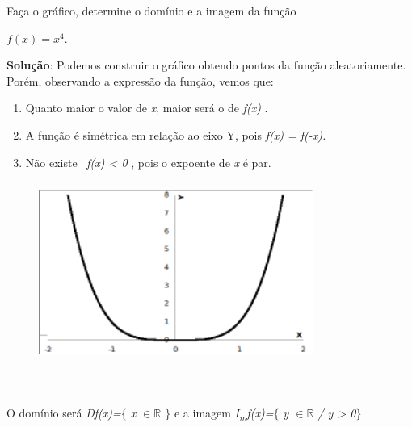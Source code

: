 \begin{texemplo}
Faça o gráfico, determine o domínio e a imagem da função 

\quad  $ f \left( x \right) =x^{4}$.

\begin{justify}
\textbf{Solução}: Podemos construir o gráfico obtendo pontos da função aleatoriamente. Porém, observando a expressão da função, vemos que: 
\end{justify}

\begin{enumerate}[label=(\roman*)]
	\item Quanto maior o valor de \textit{x}, maior será o de \textit{f(x) }. 

	\item A função é simétrica em relação ao eixo Y, pois \textit{f(x) = f(-x).} 

	\item  Não existe~ \textit{f(x) < 0 }, pois o expoente de \textit{x} é par.
\end{enumerate}

\begin{figure}[H]
	\begin{Center}
		\includegraphics[width=3.54in,height=2.34in]{capitulos/outras_funcoes/media/image19.pdf}
	\end{Center}
\end{figure}

~~

O domínio será \textit{Df(x)=$ \{ $ x $ \in \mathbb{R} $  \textbf{ }$ \} $ } e a imagem \textit{I\textsubscript{m}f(x)=$ \{ $ y $ \in \mathbb{R} $  \textbf{ }/ y > 0$ \} $ } \qedsymbol{}

\end{texemplo}

